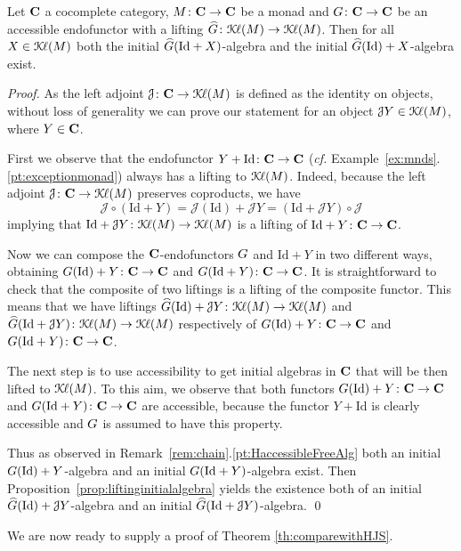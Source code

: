 \documentclass[oribibl,envcountsame,envcountsect,runningheads]{llncs}
\newcommand{\Kl}{\mathcal{K}{\kern-.2ex}\ell}
\newcommand{\lift}[1]{\smash{\widehat{#1}}}
\newcommand{\J}{\mathcal{J}}
\renewcommand{\>}{\rangle}
\def\Id{\mathrm{Id}}
\def\:{\colon}
\begin{document}
\newcommand{\propliftingCoproduct}{Let $\C$ a cocomplete category, $M \colon \C \to \C$ be a monad and $\GFG \: \C \to \C$ be an accessible endofunctor with a lifting $\lift{\GFG} \colon \Kl(M) \to \Kl(M)$. Then for all $X \in \Kl(M)$ both the initial $\lift{\GFG}(\Id+X)$-algebra and the initial $\lift{\GFG}(\Id)+X$-algebra exist.}
\begin{proposition} \label{prop:liftingCoproduct}
\propliftingCoproduct
\end{proposition}
\begin{proof} As the left adjoint $\J \: \C \to \Kl(M)$ is defined as the identity on objects, without loss of generality we can prove our statement for an object $\J Y \in \Kl(M)$, where $Y \in \mathbf{C}$.

First we observe that the endofunctor $Y + \Id \colon \C \to \C$ (\emph{cf.} Example~\ref{ex:mnds}.\ref{pt:exceptionmonad}) always has a lifting to $\Kl(M)$. Indeed, because the left adjoint $\J \: \C \to \Kl(M)$ preserves coproducts, we have
 \[\J \circ ( \Id + Y) = \J(\Id) + \J Y = (\Id +\J Y) \circ \J\]
 implying that $\Id + \J Y \: \Kl(M)\to \Kl(M)$ is a lifting of $\Id +Y \colon \C \to \C$.

 Now we can compose the $\mathbf{C}$-endofunctors $G$ and $\Id + Y $ in two different ways, obtaining $ \GFG(\Id)+ Y \colon \C \to \C$ and $\GFG(\Id+Y)\colon \C \to \C$. It is straightforward to check that the composite of two liftings is a lifting of the composite functor. This means that we have liftings $\lift{\GFG}(\Id) + \J Y\colon \Kl(M) \to \Kl(M)$ and $\lift{\GFG}(\Id+\J Y)\colon \Kl(M) \to \Kl(M)$ respectively of $\GFG(\Id) + Y\colon \C \to \C$ and $\GFG(\Id+Y)\colon \C \to \C$.

 The next step is to use accessibility to get initial algebras in $\mathbf{C}$ that will be then lifted to $\Kl(M)$. To this aim, we observe that both functors $\GFG(\Id)+ Y \colon \C \to \C$ and $\GFG(\Id+Y)\colon \C \to \C$ are accessible, because the functor $Y + \Id$ is clearly accessible and $G$ is assumed to have this property.

Thus as observed in Remark~\ref{rem:chain}.\ref{pt:HaccessibleFreeAlg} both an initial $\GFG(\Id)+ Y$-algebra and an initial $\GFG(\Id+Y)$-algebra exist. Then Proposition~\ref{prop:liftinginitialalgebra} yields the existence both of an initial $\lift{\GFG}(\Id)+ \J Y$-algebra and an initial $\lift{\GFG}(\Id+\J Y)$-algebra. \qed
\end{proof}

We are now ready to supply a proof of Theorem \ref{th:comparewithHJS}.
\end{document}
